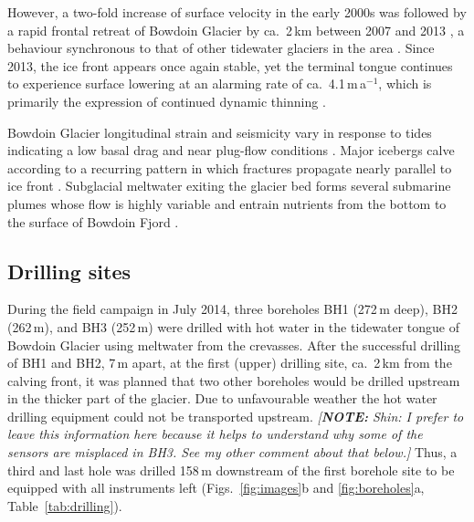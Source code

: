 \documentclass[utf8]{article}
\newcommand{\note}[1]{\textcolor{c0}{\emph{[\textbf{NOTE:} #1]}}}
\begin{document}
    However, a two-fold increase of surface velocity in the early 2000s was
    followed by a rapid frontal retreat of Bowdoin Glacier by ca.~2\,km between
    2007 and 2013 \citep[Fig.~2]{Sugiyama.etal.2015}, a behaviour synchronous
    to that of other tidewater glaciers in the area
    \citep{Sakakibara.Sugiyama.2018}. Since 2013, the ice front appears once
    again stable, yet the terminal tongue continues to experience surface
    lowering at an alarming rate of ca.~4.1\,m\,a$^{-1}$, which is primarily
    the expression of continued dynamic thinning \citep{Tsutaki.etal.2016}.

    Bowdoin Glacier longitudinal strain and seismicity vary in response to
    tides~\citep{Podolskiy.etal.2016, Podolskiy.etal.2017} indicating a low
    basal drag and near plug-flow conditions \citep{Seddik.etal.2019}. Major
    icebergs calve according to a recurring pattern in which fractures
    propagate nearly parallel to ice front \citep{Jouvet.etal.2017}. Subglacial
    meltwater exiting the glacier bed forms several submarine plumes whose flow
    is highly variable \citep{Jouvet.etal.2018} and entrain nutrients from the
    bottom to the surface of Bowdoin Fjord \citep{Kanna.etal.2018}.


\subsection{Drilling sites}

    During the field campaign in July 2014, three boreholes BH1 (272\,m deep),
    BH2 (262\,m), and BH3 (252\,m)
    were drilled with hot water in the tidewater tongue of Bowdoin Glacier
    using meltwater from the crevasses. After the successful drilling of BH1
    and BH2, 7\,m apart, at the first (upper) drilling site, ca.~2\,km from the
    calving front, it was planned that two other boreholes would be drilled
    upstream in the thicker part of the glacier. Due to unfavourable weather the
    hot water drilling equipment could not be transported upstream.
    \note{Shin: I prefer to leave this information here because it helps to
          understand why some of the sensors are misplaced in BH3. See my other
          comment about that below.}
    Thus, a third
    and last hole was drilled 158\,m downstream of the first borehole site
    to be equipped with all instruments left (Figs.~\ref{fig:images}b and
    \ref{fig:boreholes}a, Table~\ref{tab:drilling}).
\end{document}
